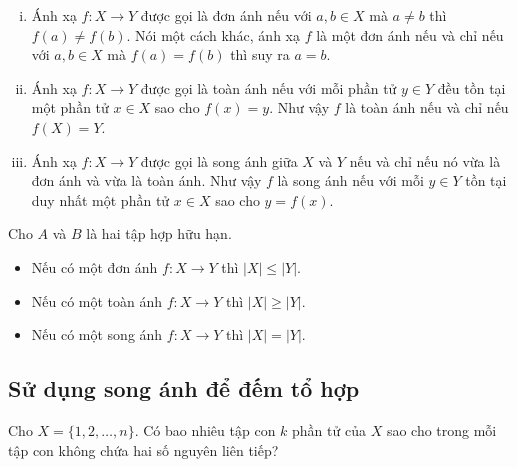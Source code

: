 \begin{dn}\textrm{}
	\begin{enumerate}[i)]
		\item Ánh xạ $f\colon X \longrightarrow Y$ được gọi là đơn ánh nếu với $a,b \in X$ mà $a\ne b$ thì $f(a)\ne f(b)$. Nói một cách khác, ánh xạ $f$ là một đơn ánh nếu và chỉ nếu với $a,b \in X$ mà $f(a)=f(b)$ thì suy ra $a=b$.
		\item Ánh xạ $f\colon X \longrightarrow Y$ được gọi là toàn ánh nếu với mỗi phần tử $y \in Y$ đều tồn tại một phần tử $x\in X$ sao cho $f(x)=y$. Như vậy $f$ là toàn ánh nếu và chỉ nếu $f(X)=Y$.
		\item Ánh xạ $f \colon X \longrightarrow Y$ được gọi là song ánh giữa $X$ và $Y$ nếu và chỉ nếu nó vừa là đơn ánh và vừa là toàn ánh. Như vậy $f$ là song ánh nếu với mỗi $y\in Y$ tồn tại duy nhất một phần tử $x \in X$ sao cho $y=f(x)$.
		
	\end{enumerate}
\end{dn}

\begin{dl}
	Cho $A$ và $B$ là hai tập hợp hữu hạn.
	\begin{itemize}
		\item Nếu có một đơn ánh $f \colon X \longrightarrow Y$ thì $|X| \leq |Y|$.
		\item  Nếu có một toàn ánh $f \colon X \longrightarrow Y$ thì $|X|\geq|Y|$.
		\item Nếu có một song ánh $f \colon X \longrightarrow Y$ thì $|X|=|Y|$.
	\end{itemize}
\end{dl}

\subsection{Sử dụng song ánh để đếm tổ hợp}

\begin{bt}%
	Cho $X=\{1,2,\ldots ,n\}$. Có bao nhiêu tập con $k$ phần tử của $X$ sao cho trong mỗi tập con không chứa hai số nguyên liên tiếp?
\end{bt}

